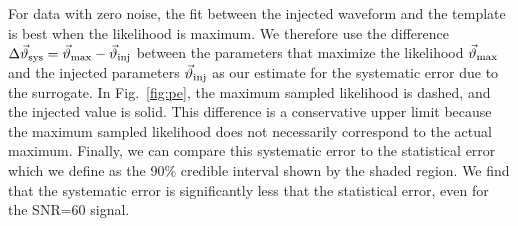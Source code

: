 \documentclass[prd,aps,letter,twocolumn,floatfix,notitlepage,nofootinbib]{revtex4-1}
\begin{document}
For data with zero noise, the fit between the injected waveform and the template is best when the likelihood is maximum. We therefore use the difference $\Delta\vec\vartheta_{\rm sys} = \vec\vartheta_{\rm max} - \vec\vartheta_{\rm inj}$ between the parameters that maximize the likelihood $\vec\vartheta_{\rm max}$ and the injected parameters $\vec\vartheta_{\rm inj}$ as our estimate for the systematic error due to the surrogate. In Fig.~\ref{fig:pe}, the maximum sampled likelihood is dashed, and the injected value is solid. This difference is a conservative upper limit because the maximum sampled likelihood does not necessarily correspond to the actual maximum. 
Finally, we can compare this systematic error to the statistical error which we define as the 90\% credible interval shown by the shaded region. We find that the systematic error is significantly less that the statistical error, even for the SNR=60 signal.



%
\end{document}

